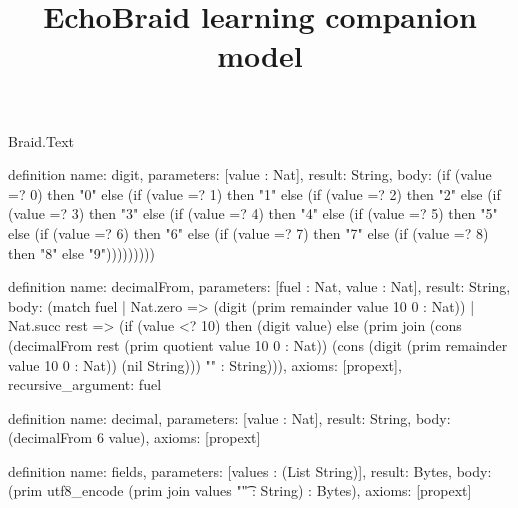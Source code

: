 \begin{lexlean}{Braid.Text}
\title{EchoBraid learning companion model}
\begin{semanticmodule}
definition{
  name: digit,
  parameters: [value : Nat],
  result: String,
  body: (if (value =? 0) then "0" else (if (value =? 1) then "1" else (if (value =? 2) then "2" else (if (value =? 3) then "3" else (if (value =? 4) then "4" else (if (value =? 5) then "5" else (if (value =? 6) then "6" else (if (value =? 7) then "7" else (if (value =? 8) then "8" else "9")))))))))
}

definition{
  name: decimalFrom,
  parameters: [fuel : Nat, value : Nat],
  result: String,
  body: (match fuel
    | Nat.zero => (digit (prim remainder value 10 0 : Nat))
    | Nat.succ rest => (if (value <? 10) then (digit value) else (prim join (cons (decimalFrom rest (prim quotient value 10 0 : Nat)) (cons (digit (prim remainder value 10 0 : Nat)) (nil String))) "" : String))),
  axioms: [propext],
  recursive_argument: fuel
}

definition{
  name: decimal,
  parameters: [value : Nat],
  result: String,
  body: (decimalFrom 6 value),
  axioms: [propext]
}

definition{
  name: fields,
  parameters: [values : (List String)],
  result: Bytes,
  body: (prim utf8_encode (prim join values "\t" : String) : Bytes),
  axioms: [propext]
}
\end{semanticmodule}
\end{lexlean}
